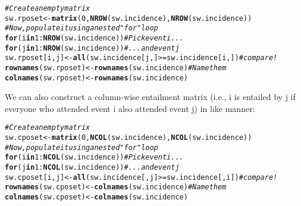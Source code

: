 \documentclass[11pt, oneside]{article}\usepackage[]{graphicx}\usepackage[]{color}
\makeatletter
\newcommand{\hlnum}[1]{\textcolor[rgb]{0.686,0.059,0.569}{#1}}%
\newcommand{\hlcom}[1]{\textcolor[rgb]{0.678,0.584,0.686}{\textit{#1}}}%
\newcommand{\hlopt}[1]{\textcolor[rgb]{0,0,0}{#1}}%
\newcommand{\hlstd}[1]{\textcolor[rgb]{0.345,0.345,0.345}{#1}}%
\newcommand{\hlkwa}[1]{\textcolor[rgb]{0.161,0.373,0.58}{\textbf{#1}}}%
\newcommand{\hlkwb}[1]{\textcolor[rgb]{0.69,0.353,0.396}{#1}}%
\newcommand{\hlkwd}[1]{\textcolor[rgb]{0.737,0.353,0.396}{\textbf{#1}}}%
\newenvironment{kframe}{%
 \def\at@end@of@kframe{}%
 \ifinner\ifhmode%
  \def\at@end@of@kframe{\end{minipage}}%
  \begin{minipage}{\columnwidth}%
 \fi\fi%
 \def\FrameCommand##1{\hskip\@totalleftmargin \hskip-\fboxsep
 \colorbox{shadecolor}{##1}\hskip-\fboxsep
     \hskip-\linewidth \hskip-\@totalleftmargin \hskip\columnwidth}%
 \MakeFramed {\advance\hsize-\width
   \@totalleftmargin\z@ \linewidth\hsize
   \@setminipage}}%
 {\par\unskip\endMakeFramed%
 \at@end@of@kframe}
\newenvironment{knitrout}{}{} %
\newenvironment{prob}[2][Problem]{\begin{trivlist}
\item[\hskip \labelsep {\bfseries #1}\hskip \labelsep {\bfseries #2.}]}{\end{trivlist}}
\makeatother
\begin{document}
\begin{prob}{2}
\begin{enumerate}
\begin{knitrout}
\color{fgcolor}\begin{kframe}
\begin{alltt}
\hlcom{#Create an empty matrix}
\hlstd{sw.rposet}\hlkwb{<-}\hlkwd{matrix}\hlstd{(}\hlnum{0}\hlstd{,}\hlkwd{NROW}\hlstd{(sw.incidence),} \hlkwd{NROW}\hlstd{(sw.incidence))}
\hlcom{#Now, populate it using a nested "for" loop}
\hlkwa{for}\hlstd{(i} \hlkwa{in} \hlnum{1}\hlopt{:}\hlkwd{NROW}\hlstd{(sw.incidence))}            \hlcom{#Pick event i...}
        \hlkwa{for}\hlstd{(j} \hlkwa{in} \hlnum{1}\hlopt{:}\hlkwd{NROW}\hlstd{(sw.incidence))}     \hlcom{# ... and event j}
                \hlstd{sw.rposet[i,j]}\hlkwb{<-}\hlkwd{all}\hlstd{(sw.incidence[j,]}\hlopt{>=}\hlstd{sw.incidence[i,])}\hlcom{#compare!}
\hlkwd{rownames}\hlstd{(sw.rposet)}\hlkwb{<-}\hlkwd{rownames}\hlstd{(sw.incidence)}              \hlcom{#Name them}
\hlkwd{colnames}\hlstd{(sw.rposet)}\hlkwb{<-}\hlkwd{rownames}\hlstd{(sw.incidence)}
\end{alltt}
\end{kframe}
\end{knitrout}

\noindent
We can also construct a column-wise entailment matrix (i.e., i is entailed by j if everyone who attended event i also attended event j) in like manner:

\begin{knitrout}
\color{fgcolor}\begin{kframe}
\begin{alltt}
\hlcom{#Create an empty matrix }
\hlstd{sw.cposet}\hlkwb{<-}\hlkwd{matrix}\hlstd{(}\hlnum{0}\hlstd{,}\hlkwd{NCOL}\hlstd{(sw.incidence),} \hlkwd{NCOL}\hlstd{(sw.incidence))}
\hlcom{#Now, populate it using a nested "for" loop }
\hlkwa{for}\hlstd{(i} \hlkwa{in} \hlnum{1}\hlopt{:}\hlkwd{NCOL}\hlstd{(sw.incidence))} \hlcom{#Pick event i... }
        \hlkwa{for}\hlstd{(j} \hlkwa{in} \hlnum{1}\hlopt{:}\hlkwd{NCOL}\hlstd{(sw.incidence))} \hlcom{# ... and event j }
                \hlstd{sw.cposet[i,j]}\hlkwb{<-}\hlkwd{all}\hlstd{(sw.incidence[,j]}\hlopt{>=}\hlstd{sw.incidence[,i])}\hlcom{#compare! }
\hlkwd{rownames}\hlstd{(sw.cposet)}\hlkwb{<-}\hlkwd{colnames}\hlstd{(sw.incidence)} \hlcom{#Name them }
\hlkwd{colnames}\hlstd{(sw.cposet)}\hlkwb{<-}\hlkwd{colnames}\hlstd{(sw.incidence)}
\end{alltt}
\end{kframe}
\end{knitrout}


\end{enumerate}
\end{prob}
\end{document}
